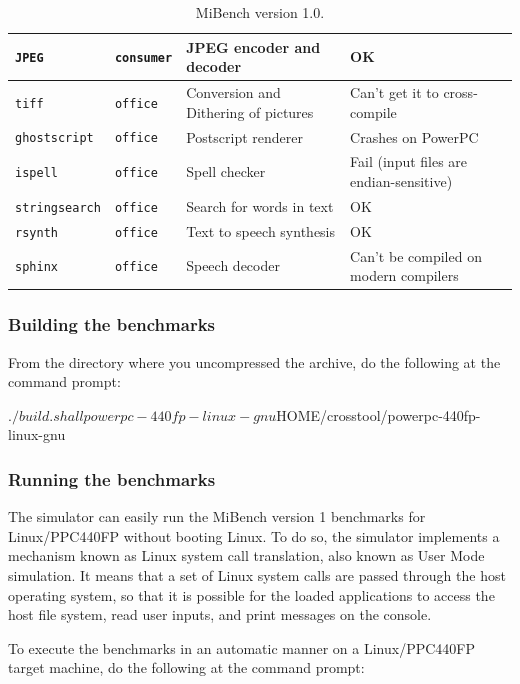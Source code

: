 \begin{table}[p]
\begin{center}
\begin{tabular}{|l|l|p{5cm}|p{5cm}|}
		\hline
		\texttt{JPEG} & \texttt{consumer} & JPEG encoder and decoder & OK \\
		\hline
		\texttt{tiff} & \texttt{office} & Conversion and Dithering of pictures & Can't get it to cross-compile \\
		\hline
		\texttt{ghostscript} & \texttt{office} & Postscript renderer & Crashes on PowerPC  \\
		\hline
		\texttt{ispell} & \texttt{office} & Spell checker & Fail (input files are endian-sensitive)\\
		\hline
		\texttt{stringsearch} & \texttt{office} & Search for words in text & OK \\
		\hline
		\texttt{rsynth} & \texttt{office} & Text to speech synthesis & OK \\
		\hline
		\texttt{sphinx} & \texttt{office} & Speech decoder & Can't be compiled on modern compilers \\
		\hline
		\end{tabular}
	\end{center}
	\caption{MiBench version 1.0.}
	\label{table:mibench}
\end{table}

\subsubsection{Building the benchmarks}

From the directory where you uncompressed the archive, do the following at the command prompt:
\begin{script}
   $ ./build.sh all powerpc-440fp-linux-gnu ${HOME}/crosstool/powerpc-440fp-linux-gnu
\end{script}

\subsubsection{Running the benchmarks}

The simulator can easily run the MiBench version 1 benchmarks for Linux/PPC440FP without booting Linux.
To do so, the simulator implements a mechanism known as Linux system call translation, also known as User Mode simulation.
It means that a set of Linux system calls are passed through the host operating system, so that it is possible for the loaded applications to access the host file system, read user inputs, and print messages on the console.

\noindent To execute the benchmarks in an automatic manner on a Linux/PPC440FP target machine, do the following at the command prompt:

